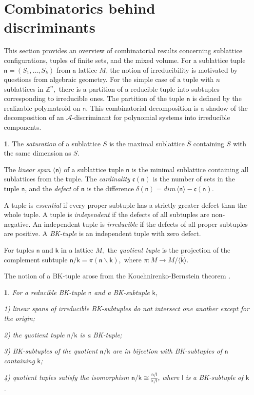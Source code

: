 \documentclass[11pt]{article}
\theoremstyle{plain}
\theoremstyle{definition}
\newtheorem{defn}[thm]{\protect\definitionname}
\theoremstyle{remark}
\theoremstyle{plain}
\theoremstyle{plain}
\newtheorem{prop}[thm]{\protect\propositionname}
\theoremstyle{plain}
\theoremstyle{definition}
\providecommand{\definitionname}{Definition}
\providecommand{\propositionname}{Proposition}
\begin{document}
\section{\label{Section. Combinatorial Review}Combinatorics behind discriminants}

This section provides an overview of combinatorial results concerning
sublattice configurations, tuples of finite sets, and the mixed volume.
For a sublattice tuple $\mathsf{n}=(S_{1},...,S_{k})$ from a lattice
$M$, the notion of irreducibility is motivated by questions from
algebraic geometry. For the simple case of a tuple with $n$ sublattices
in $\mathbb{Z}^{n},$ there is a partition of a reducible tuple into
subtuples corresponding to irreducible ones. The partition of the
tuple $\mathsf{n}$ is defined by the realizable polymatroid on $\mathsf{n}$.
This combinatorial decomposition is a shadow of the decomposition
of an $\mathscr{A}$-discriminant for polynomial systems into irreducible
components.
\begin{defn}
The \textit{saturation} of a sublattice $S$ is the maximal sublattice
$\overline{S}$ containing $S$ with the same dimension as $S$.

The \textit{linear span} $\langle\mathsf{n}\rangle$ of a sublattice
tuple $\mathsf{n}$ is the minimal sublattice containing all sublattices
from the tuple. The \textit{cardinality} $\mathfrak{c}(\mathsf{n})$
is the number of sets in the tuple $\mathsf{n}$, and the \textit{defect}
of $\mathsf{n}$ is the difference $\delta(\mathsf{n})=dim\,\langle\mathsf{n}\rangle-\mathfrak{c}(\mathsf{n}).$

A tuple is \textit{essential} if every proper subtuple has a strictly
greater defect than the whole tuple. A tuple is\textit{ independent}
if the defects of all subtuples are non-negative. An independent tuple
is \textit{irreducible} if the defects of all proper subtuples are
positive. A \textit{BK-tuple} is an independent tuple with zero defect.

For tuples $\mathsf{n}$ and $\mathscr{\mathsf{k}}$ in a lattice
$M,$ the \textit{quotient tuple} is the projection of the complement
subtuple $\mathsf{n}/\mathsf{k}=\pi(\mathsf{n}\backslash\mathsf{k}),$
where $\pi:M\rightarrow M/\overline{\langle\mathsf{k}\rangle}$.
\end{defn}

The notion of a BK-tuple arose from the Kouchnirenko-Bernstein theorem
\cite{bernshtein_number_1975}.
\begin{prop}
\textup{\cite{pokidkin_combinatorics_2025}} For a reducible BK-tuple
$\mathsf{n}$ and a BK-subtuple $\mathsf{k}$,

1) linear spans of irreducible BK-subtuples do not intersect one another
except for the origin;

2) the quotient tuple $\mathsf{n}/\mathsf{k}$ is a BK-tuple;

3) BK-subtuples of the quotient $\mathsf{n}/\mathsf{k}$ are in bijection
with BK-subtuples of $\mathsf{n}$ containing $\mathsf{k}$;

4) quotient tuples satisfy the isomorphism $\mathsf{n}/\mathsf{k}\cong\frac{\mathsf{n}/\mathsf{l}}{\mathsf{k}/\mathsf{l}}$,
where $\mathsf{l}$ is a BK-subtuple of $\mathsf{k}$.
\end{prop}
\end{document}
